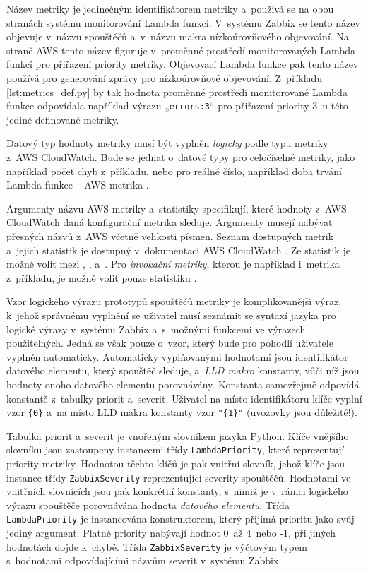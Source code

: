 \documentclass[czech, ing, kiv, he, iso690]{fasthesis}
\begin{document}
Název metriky je jedinečným identifikátorem metriky a~používá se na obou stranách systému monitorování Lambda funkcí. V~systému Zabbix se tento název objevuje v~názvu spouštěčů a~v~názvu makra nízkoúrovňového objevování. Na straně AWS tento název figuruje v~proměnné prostředí monitorovaných Lambda funkcí pro přiřazení priority metriky. Objevovací Lambda funkce pak tento název používá pro generování zprávy pro nízkoúrovňové objevování. Z~příkladu \ref{lst:metrics_def.py} by tak hodnota proměnné prostředí monitorované Lambda funkce odpovídala například výrazu „\verb|errors:3|“ pro přiřazení priority 3~u této jediné definované metriky.

Datový typ hodnoty metriky musí být vyplněn \emph{logicky} podle typu metriky z~AWS CloudWatch. Bude se jednat o~datové typy  pro celočíselné metriky, jako například počet chyb z~příkladu, nebo  pro reálné číslo, například doba trvání Lambda funkce -- AWS metrika . 

Argumenty názvu AWS metriky a~statistiky specifikují, které hodnoty z~AWS CloudWatch daná konfigurační metrika sleduje. Argumenty musejí nabývat přesných názvů z~AWS včetně velikosti písmen. Seznam dostupných metrik a~jejich statistik je dostupný v~dokumentaci AWS CloudWatch \cite{lambda.docs.aws}. Ze statistik je možné volit mezi , ,  a~. Pro \emph{invokační metriky}, kterou je například i~metrika  z~příkladu, je možné volit pouze statistiku . 

Vzor logického výrazu prototypů spouštěčů metriky je komplikovanější výraz, k~jehož správnému vyplnění se uživatel musí seznámit se syntaxí jazyka pro logické výrazy v~systému Zabbix a~s~možnými funkcemi ve výrazech použitelných. Jedná se však pouze o~vzor, který bude pro pohodlí uživatele vyplněn automaticky. Automaticky vyplňovanými hodnotami jsou identifikátor datového elementu, který spouštěč sleduje, a~\emph{LLD makro} konstanty, vůči níž jsou hodnoty onoho datového elementu porovnávány. Konstanta samozřejmě odpovídá konstantě z~tabulky priorit a~severit. Uživatel na místo identifikátoru klíče vyplní vzor \verb|{0}| a~na místo LLD makra konstanty vzor \verb|"{1}"| (uvozovky jsou důležité!). 

Tabulka priorit a~severit je vnořeným slovníkem jazyka Python. Klíče vnějšího slovníku jsou zastoupeny instancemi třídy \verb|LambdaPriority|, které reprezentují priority metriky. Hodnotou těchto klíčů je pak vnitřní slovník, jehož klíče jsou instance třídy \verb|ZabbixSeverity| reprezentující severity spouštěčů. Hodnotami ve vnitřních slovnících jsou pak konkrétní konstanty, s~nimiž je v~rámci logického výrazu spouštěče porovnávána hodnota \emph{datového elementu}. Třída \verb|LambdaPriority| je instancována konstruktorem, který přijímá prioritu jako svůj jediný argument. Platné priority nabývají hodnot 0~až 4~nebo -1, při jiných hodnotách dojde k~chybě. Třída \verb|ZabbixSeverity| je výčtovým typem s~hodnotami odpovídajícími názvům severit v~systému Zabbix. 
\end{document}
